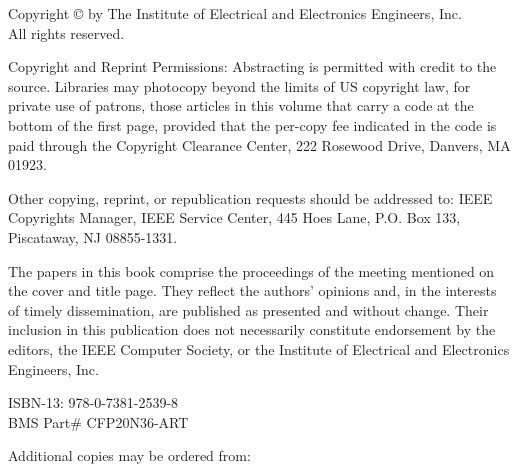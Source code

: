 \clearpage
\thispagestyle{empty}
\begin{center}
Copyright \copyright{} \the\year{}
by The Institute of Electrical and Electronics Engineers, Inc.\\
All rights reserved.
\end{center}

Copyright and Reprint Permissions: Abstracting is permitted with credit to the source. Libraries may photocopy beyond the limits of US copyright law, for private use of patrons, those articles in this volume that carry a code at the bottom of the first page, provided that the per-copy fee indicated in the code is paid through the Copyright Clearance Center, 222 Rosewood Drive, Danvers, MA 01923.

Other copying, reprint, or republication requests should be addressed to: IEEE Copyrights Manager, IEEE Service Center, 445 Hoes Lane, P.O. Box 133, Piscataway, NJ 08855-1331.

The papers in this book comprise the proceedings of the meeting mentioned on the cover and title page. They reflect the authors’ opinions and, in the interests of timely dissemination, are published as presented and without change. Their inclusion in this publication does not necessarily constitute endorsement by the editors, the IEEE Computer Society, or the Institute of Electrical and Electronics Engineers, Inc.

\begin{center}
ISBN-13: 978-0-7381-2539-8\\
BMS Part\# CFP20N36-ART
\end{center}

\begin{center}
Additional copies may be ordered from:
\end{center}


